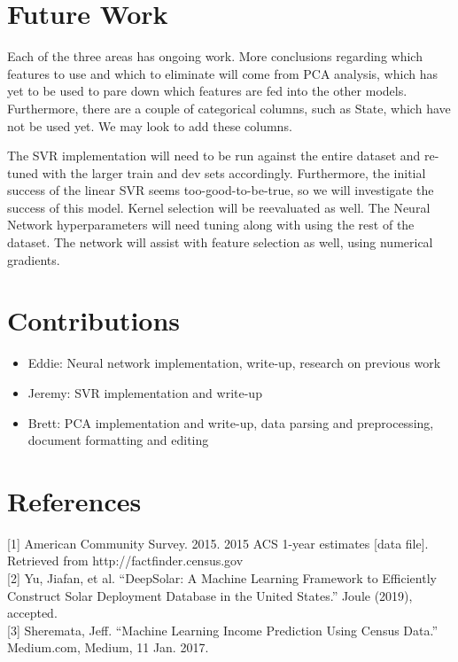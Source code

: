 \documentclass{article}
\begin{document}
	
	\section{Future Work}
	Each of the three areas has ongoing work. More conclusions regarding which features to use and which to eliminate will come from PCA analysis, which has yet to be used to pare down which features are fed into the other models. Furthermore, there are a couple of categorical columns, such as State, which have not be used yet. We may look to add these columns.
	
	The SVR implementation will need to be run against the entire dataset and re-tuned with the larger train and dev sets accordingly. Furthermore, the initial success of the linear SVR seems too-good-to-be-true, so we will investigate the success of this model. Kernel selection will be reevaluated as well. The Neural Network hyperparameters will need tuning along with using the rest of the dataset. The network will assist with feature selection as well, using numerical gradients.
	
	\section*{Contributions}
		\begin{itemize}[noitemsep,nolistsep]
			\item Eddie: Neural network implementation, write-up, research on previous work
			\item Jeremy: SVR implementation and write-up
			\item Brett: PCA implementation and write-up, data parsing and preprocessing, document formatting and editing
		\end{itemize}
	
	\section*{References}
	\smallskip
	\scriptsize
	\setlength{\parindent}{0in}
	[1] American Community Survey. 2015.  2015 ACS 1-year estimates [data file]. Retrieved from http://factfinder.census.gov\\ [0.5pt]
	
	[2] Yu, Jiafan, et al. “DeepSolar: A Machine Learning Framework to Efficiently Construct Solar Deployment Database in the United States.” Joule (2019), accepted.\\ [0.5pt]
	
	[3] Sheremata, Jeff. “Machine Learning Income Prediction Using Census Data.” Medium.com, Medium, 11 Jan. 2017.\\ [0.5pt]
	
\end{document}
